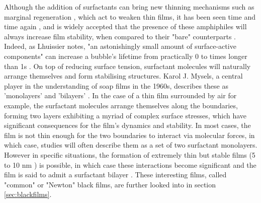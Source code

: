 \documentclass[a4paper,12pt]{article}
\numberwithin{equation}{section}
\numberwithin{figure}{section}
\numberwithin{table}{section}
\begin{document}
\begin{comment}
\begin{figure}[!htbp]
    \centering
    \captionsetup{width=.9\linewidth}
    \texttt{[image: MyselsFig1.jpg]}
    \caption{Early schematic of the adsorption structures followed by surfactant molecules \cite{Mysels1968Nomenclature}. The hydrophobic tails and hydrophilic heads of these amphiphiles are seen to orient themselves in a structured manner along interfaces.}
    \label{fig:Mysels1}
\end{figure}
\end{comment}

Although the addition of surfactants can bring new thinning mechanisms such as marginal regeneration \cite{Mysels1959Book, Nierstrasz1999}, which act to weaken thin films, it has been seen time and time again \cite{Bhamla2017, ChampougnyNotBare2016, Modini2013, Lhuissier2011, Pfeiffer2020}, and is widely accepted that the presence of these amphiphiles will always increase film stability, when compared to their "bare" counterparts \cite{Debregeas1998}. Indeed, as Lhuissier notes, "an astonishingly small amount of surface-active components" can increase a bubble's lifetime from practically 0 to times longer than 1s \cite{Lhuissier2011, Breward2002}. On top of reducing surface tension, surfactant molecules will naturally arrange themselves and form stabilising structures. Karol J. Mysels, a central player in the understanding of soap films in the 1960s, describes these as 'monolayers' and 'bilayers' \cite{Mysels1968Nomenclature}. In the case of a thin film surrounded by air for example, the surfactant molecules arrange themselves along the boundaries, forming two layers exhibiting a myriad of complex surface stresses, which have significant consequences for the film's dynamics and stability. In most cases, the film is not thin enough for the two boundaries to interact via molecular forces, in which case, studies will often describe them as a set of two surfactant monolayers. However in specific situations, the formation of extremely thin but stable films (5 to 10 nm \cite{Seung2006}) is possible, in which case these interactions become significant and the film is said to admit a surfactant bilayer \cite{Vrij1968, Breward2002, Cantat2010}. These interesting films, called "common" or "Newton" black films, are further looked into in section \ref{sec:blackfilms}.
\end{document}
